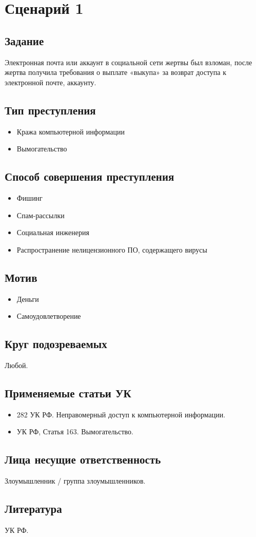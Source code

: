 \section*{Сценарий 1}

\subsection*{Задание}

Электронная почта или аккаунт в социальной сети жертвы был взломан, после
жертва получила требования о выплате «выкупа» за возврат доступа к электронной
почте, аккаунту.

\subsection*{Тип преступления}
\begin{itemize}
  \item Кража компьютерной информации
  \item Вымогательство
\end{itemize}

\subsection*{Способ совершения преступления}
\begin{itemize}
  \item Фишинг
  \item Спам-рассылки
  \item Социальная инженерия
  \item Распространение нелицензионного ПО, содержащего вирусы
\end{itemize}

\subsection*{Мотив}
\begin{itemize}
  \item Деньги
  \item Самоудовлетворение
\end{itemize}

\subsection*{Круг подозреваемых}
Любой.

\subsection*{Применяемые статьи УК}
\begin{itemize}
  \item 282 УК РФ. Неправомерный доступ к компьютерной информации.
  \item УК РФ, Статья 163. Вымогательство.
\end{itemize}

\subsection*{Лица несущие ответственность}
Злоумышленник / группа злоумышленников.

\subsection*{Литература} УК РФ.
